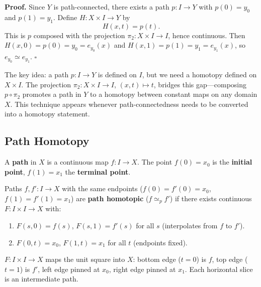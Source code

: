 \documentclass[11pt]{report}
\renewenvironment{proof}[1][Proof]{\noindent\textbf{#1.} }{\hfill$\square$\par\vspace{5pt}}
\begin{document}
\begin{proof}
Since $Y$ is path-connected, there exists a path $p: I \to Y$ with $p(0) = y_0$ and $p(1) = y_1$. Define $H: X \times I \to Y$ by
\[H(x, t) = p(t).\]
This is $p$ composed with the projection $\pi_2: X \times I \to I$, hence continuous. Then $H(x, 0) = p(0) = y_0 = e_{y_0}(x)$ and $H(x, 1) = p(1) = y_1 = e_{y_1}(x)$, so $e_{y_0} \simeq e_{y_1}$.
\end{proof}

\begin{rembox}
The key idea: a path $p: I \to Y$ is defined on $I$, but we need a homotopy defined on $X \times I$. The projection $\pi_2: X \times I \to I$, $(x, t) \mapsto t$, bridges this gap---composing $p \circ \pi_2$ promotes a path in $Y$ to a homotopy between constant maps on any domain $X$. This technique appears whenever path-connectedness needs to be converted into a homotopy statement.
\end{rembox}

\subsection{Path Homotopy}

\begin{defbox}[Path]
A \textbf{path} in $X$ is a continuous map $f: I \to X$. The point $f(0) = x_0$ is the \textbf{initial point}, $f(1) = x_1$ the \textbf{terminal point}.
\end{defbox}

\begin{defbox}
Paths $f, f': I \to X$ with the same endpoints ($f(0) = f'(0) = x_0$, $f(1) = f'(1) = x_1$) are \textbf{path homotopic} ($f \simeq_p f'$) if there exists continuous $F: I \times I \to X$ with:
\begin{enumerate}
    \item $F(s, 0) = f(s)$, $F(s, 1) = f'(s)$ for all $s$ (interpolates from $f$ to $f'$).
    \item $F(0, t) = x_0$, $F(1, t) = x_1$ for all $t$ (endpoints fixed).
\end{enumerate}
\end{defbox}

\begin{rembox}
$F: I \times I \to X$ maps the unit square into $X$: bottom edge ($t=0$) is $f$, top edge ($t=1$) is $f'$, left edge pinned at $x_0$, right edge pinned at $x_1$. Each horizontal slice is an intermediate path.
\end{rembox}
\end{document}
